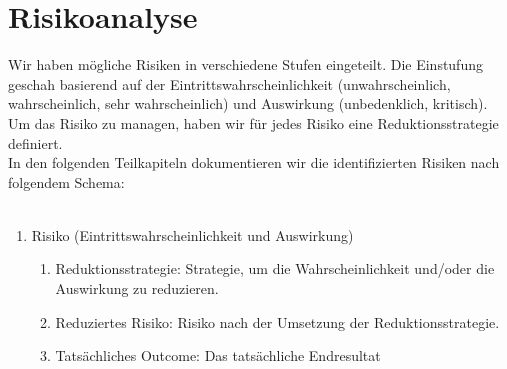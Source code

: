 \chapter{Risikoanalyse}
Wir haben mögliche Risiken in verschiedene Stufen eingeteilt.
Die Einstufung \newline geschah basierend auf der Eintrittswahrscheinlichkeit (unwahrscheinlich, wahrscheinlich, sehr wahrscheinlich) und Auswirkung (unbedenklich, kritisch). 
Um das Risiko zu managen, haben wir für jedes Risiko eine Reduktionsstrategie definiert.\\
In den folgenden Teilkapiteln dokumentieren wir die identifizierten Risiken nach \newline folgendem Schema:\\
\\
\begin{enumerate}
    \item Risiko (Eintrittswahrscheinlichkeit und Auswirkung)
    \begin{enumerate}
        \item Reduktionsstrategie: Strategie, um die Wahrscheinlichkeit und/oder die Auswirkung zu reduzieren.
        \item Reduziertes Risiko: Risiko nach der Umsetzung der Reduktionsstrategie.
        \item Tatsächliches Outcome: Das tatsächliche Endresultat
    \end{enumerate}
\end{enumerate}

